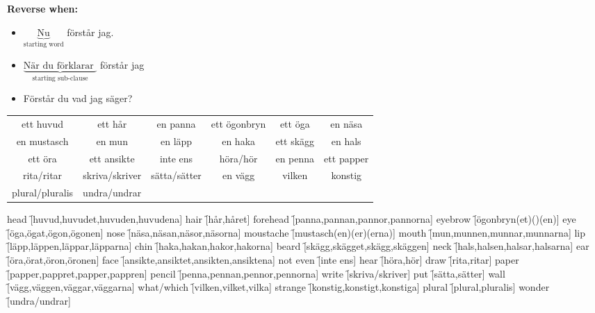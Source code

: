 
\begin{flushleft}
    \textbf{Reverse when:}
    \begin{itemize}
        \item $\underbrace{\text{Nu}}_{\text{starting word}}$ förstår jag.
        \item $\underbrace{\text{När du förklarar }}_{\text{starting sub-clause}}$ förstår jag
        \item Förstår du vad jag säger?
    \end{itemize}
\end{flushleft}

\begin{center}
    \begin{tabular}{|c c c c c c|}
        \hline
        ett huvud & ett hår & en panna & ett ögonbryn & ett öga & en näsa \\
        en mustasch & en mun & en läpp & en haka & ett skägg & en hals \\
        ett öra & ett ansikte & inte ens & höra/hör & en penna & ett papper  \\
        rita/ritar & skriva/skriver & sätta/sätter & en vägg & vilken & konstig \\
        plural/pluralis & undra/undrar &  &  &  &  \\
        \hline
    \end{tabular}
\end{center}

\begin{questions}
    \begin{multicols}{2}
        \raggedcolumns
        \question head \f[huvud,huvudet,huvuden,huvudena]
        \question hair \f[hår,håret]
        \question forehead \f[panna,pannan,pannor,pannorna]
        \question eyebrow \f[ögonbryn(et)()(en)]
        \question eye \f[öga,ögat,ögon,ögonen]
        \question nose \f[näsa,näsan,näsor,näsorna]
        \question moustache \f[mustasch(en)(er)(erna)]
        \question mouth \f[mun,munnen,munnar,munnarna]
        \question lip \f[läpp,läppen,läppar,läpparna]
        \question chin \f[haka,hakan,hakor,hakorna]
        \question beard \f[skägg,skägget,skägg,skäggen]
        \question neck \f[hals,halsen,halsar,halsarna]
        \question ear \f[öra,örat,öron,öronen]
        \question face \f[ansikte,ansiktet,ansikten,ansiktena]
        \question not even \f[inte ens]
        \question hear \f[höra,hör]
        \question draw \f[rita,ritar]
        \question paper \f[papper,pappret,papper,pappren]
        \question pencil \f[penna,pennan,pennor,pennorna]
        \question write \f[skriva/skriver]
        \question put \f[sätta,sätter]
        \question wall \f[vägg,väggen,väggar,väggarna]
        \question what/which \f[vilken,vilket,vilka]
        \question strange \f[konstig,konstigt,konstiga]
        \question plural \f[plural,pluralis]
        \question wonder \f[undra/undrar]
    \end{multicols}
\end{questions}
